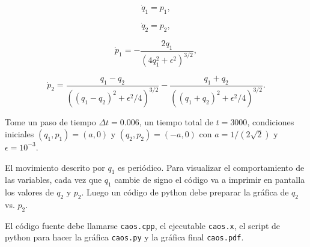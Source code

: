 \documentclass[11pt,letterpaper]{exam}
\begin{document}
\begin{questions}
\begin{equation}
\dot{q}_1 = p_1,
\end{equation}

\begin{equation}
\dot{q}_2 = p_2,
\end{equation}

\begin{equation}
\dot{p}_1 = -\frac{2q_1}{(4q_1^2 + \epsilon^2)^{3/2}},
\end{equation}

\begin{equation}
\dot{p}_2 = \frac{q_1 - q_2}{((q_1 - q_2)^2 + \epsilon^2/4)^{3/2}} -
\frac{q_1+q_2}{((q_1 + q_2)^2 + \epsilon^{2}/4)^{3/2}}.
\end{equation}


Tome un paso de tiempo $\Delta t=0.006$, un tiempo total de
$t=3000$, condiciones iniciales $(q_1, p_1)=(a,0)$ y $(q_2,
p_2)=(-a,0)$ con $a=1/(2\sqrt{2})$ y $\epsilon=10^{-3}$.


El movimiento descrito por $q_1$ es peri\'odico. Para visualizar el
comportamiento de las variables, cada vez que $q_1$ cambie de signo el c\'odigo va a imprimir en pantalla los valores de $q_2$
y $p_2$.  Luego un c\'odigo de python debe preparar la gr\'afica de
$q_2$ vs. $p_2$.

El c\'odigo fuente debe llamarse \verb"caos.cpp", el ejecutable
\verb"caos.x", el script de python para hacer la gr\'afica
\verb"caos.py" y la gr\'afica final \verb"caos.pdf".



\end{questions}
\end{document}
